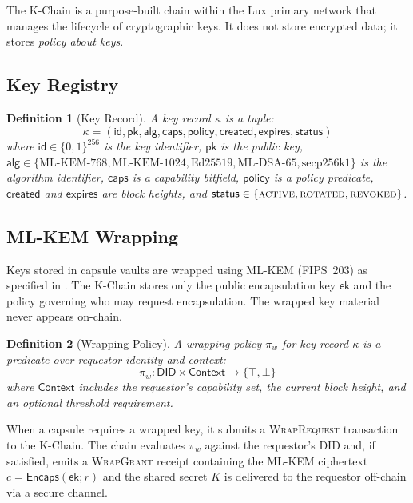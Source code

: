 \documentclass[11pt,a4paper]{article}
\newtheorem{definition}{Definition}[section]
\begin{document}
The K-Chain is a purpose-built chain within the Lux primary network that manages
the lifecycle of cryptographic keys. It does not store encrypted data; it stores
\emph{policy about keys}.

\subsection{Key Registry}

\begin{definition}[Key Record]\label{def:key-record}
A key record $\kappa$ is a tuple:
\[
    \kappa = (\mathsf{id}, \mathsf{pk}, \mathsf{alg}, \mathsf{caps}, \mathsf{policy},
              \mathsf{created}, \mathsf{expires}, \mathsf{status})
\]
where $\mathsf{id} \in \{0,1\}^{256}$ is the key identifier, $\mathsf{pk}$ is the
public key, $\mathsf{alg} \in \{\text{ML-KEM-768}, \text{ML-KEM-1024}, \text{Ed25519},
\text{ML-DSA-65}, \text{secp256k1}\}$ is the algorithm identifier, $\mathsf{caps}$
is a capability bitfield, $\mathsf{policy}$ is a policy predicate,
$\mathsf{created}$ and $\mathsf{expires}$ are block heights, and
$\mathsf{status} \in \{\textsc{active}, \textsc{rotated}, \textsc{revoked}\}$.
\end{definition}

\subsection{ML-KEM Wrapping}

Keys stored in capsule vaults are wrapped using ML-KEM (FIPS~203) as specified in
\cite{lux-pq-crypto-suite}. The K-Chain stores only the public encapsulation key
$\mathsf{ek}$ and the policy governing who may request encapsulation. The wrapped
key material never appears on-chain.

\begin{definition}[Wrapping Policy]\label{def:wrap-policy}
A wrapping policy $\pi_w$ for key record $\kappa$ is a predicate over requestor
identity and context:
\[
    \pi_w : \mathsf{DID} \times \mathsf{Context} \to \{\top, \bot\}
\]
where $\mathsf{Context}$ includes the requestor's capability set, the current block
height, and an optional threshold requirement.
\end{definition}

When a capsule requires a wrapped key, it submits a \textsc{WrapRequest} transaction
to the K-Chain. The chain evaluates $\pi_w$ against the requestor's DID and, if
satisfied, emits a \textsc{WrapGrant} receipt containing the ML-KEM ciphertext
$c = \mathsf{Encaps}(\mathsf{ek}; r)$ and the shared secret $K$ is delivered
to the requestor off-chain via a secure channel.
\end{document}
